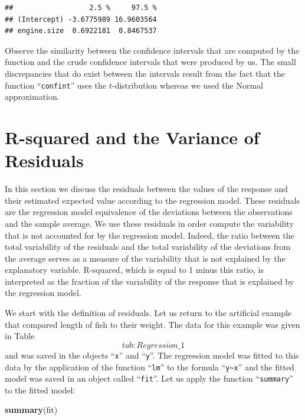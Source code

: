 \documentclass[
]{krantz}
\makeatletter
\newenvironment{Shaded}{\begin{snugshade}}{\end{snugshade}}
\newcommand{\KeywordTok}[1]{\textcolor[rgb]{0.13,0.29,0.53}{\textbf{#1}}}
\newcommand{\NormalTok}[1]{#1}
\newenvironment{kframe}{%
\medskip{}
\setlength{\fboxsep}{.8em}
 \def\at@end@of@kframe{}%
 \ifinner\ifhmode%
  \def\at@end@of@kframe{\end{minipage}}%
  \begin{minipage}{\columnwidth}%
 \fi\fi%
 \def\FrameCommand##1{\hskip\@totalleftmargin \hskip-\fboxsep
 \colorbox{shadecolor}{##1}\hskip-\fboxsep
     \hskip-\linewidth \hskip-\@totalleftmargin \hskip\columnwidth}%
 \MakeFramed {\advance\hsize-\width
   \@totalleftmargin\z@ \linewidth\hsize
   \@setminipage}}%
 {\par\unskip\endMakeFramed%
 \at@end@of@kframe}
\renewenvironment{Shaded}{\begin{kframe}}{\end{kframe}}
\theoremstyle{definition}
\theoremstyle{definition}
\theoremstyle{definition}
\theoremstyle{remark}
\makeatother
\begin{document}
\begin{verbatim}
##                  2.5 %     97.5 %
## (Intercept) -3.6775989 16.9603564
## engine.size  0.6922181  0.8467537
\end{verbatim}

Observe the similarity between the confidence intervals that are
computed by the function and the crude confidence intervals that were
produced by us. The small discrepancies that do exist between the
intervals result from the fact that the function ``\texttt{confint}'' uses the
\(t\)-distribution whereas we used the Normal approximation.

\hypertarget{r-squared-and-the-variance-of-residuals}{%
\section{R-squared and the Variance of Residuals}\label{r-squared-and-the-variance-of-residuals}}

In this section we discuss the residuals between the values of the
response and their estimated expected value according to the regression
model. These residuals are the regression model equivalence of the
deviations between the observations and the sample average. We use these
residuals in order compute the variability that is not accounted for by
the regression model. Indeed, the ratio between the total variability of
the residuals and the total variability of the deviations from the
average serves as a measure of the variability that is not explained by
the explanatory variable. R-squared, which is equal to 1 minus this
ratio, is interpreted as the fraction of the variability of the response
that is explained by the regression model.

We start with the definition of residuals. Let us return to the
artificial example that compared length of fish to their weight. The
data for this example was given in Table~\[tab:Regression\_1\] and was
saved in the objects ``\texttt{x}'' and ``\texttt{y}''. The regression model was fitted to
this data by the application of the function ``\texttt{lm}'' to the formula
``\texttt{y\textasciitilde{}x}'' and the fitted model was saved in an object called ``\texttt{fit}''. Let
us apply the function ``\texttt{summary}'' to the fitted model:

\begin{Shaded}
\begin{Highlighting}[]
\KeywordTok{summary}\NormalTok{(fit)}
\end{Highlighting}
\end{Shaded}
\end{document}
